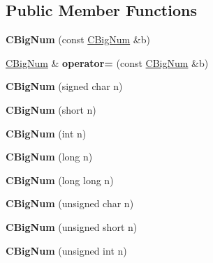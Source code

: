 \subsection*{Public Member Functions}
\begin{DoxyCompactItemize}
\item 
\mbox{\label{class_c_big_num_a50fcecb7d672c2b7d0a89e641a0682ca}} 
{\bfseries C\+Big\+Num} (const \mbox{\hyperlink{class_c_big_num}{C\+Big\+Num}} \&b)
\item 
\mbox{\label{class_c_big_num_a575e705d2120b0a43d74d798eaef48ee}} 
\mbox{\hyperlink{class_c_big_num}{C\+Big\+Num}} \& {\bfseries operator=} (const \mbox{\hyperlink{class_c_big_num}{C\+Big\+Num}} \&b)
\item 
\mbox{\label{class_c_big_num_a318644830d41471cd2bbcd702975bbb1}} 
{\bfseries C\+Big\+Num} (signed char n)
\item 
\mbox{\label{class_c_big_num_a0f4e34dcc48e9089e9f20c06418755c9}} 
{\bfseries C\+Big\+Num} (short n)
\item 
\mbox{\label{class_c_big_num_a930e53591ce24f650f7ddd1076bd4efe}} 
{\bfseries C\+Big\+Num} (int n)
\item 
\mbox{\label{class_c_big_num_a96ef554f3153f676125a49889303cf31}} 
{\bfseries C\+Big\+Num} (long n)
\item 
\mbox{\label{class_c_big_num_a221b65c70969363c1b9d940a6a2de3b5}} 
{\bfseries C\+Big\+Num} (long long n)
\item 
\mbox{\label{class_c_big_num_afe63a4eb433e69687fad44193390dc1b}} 
{\bfseries C\+Big\+Num} (unsigned char n)
\item 
\mbox{\label{class_c_big_num_a3745ad1eb1bd53c9535f8620515d3ae3}} 
{\bfseries C\+Big\+Num} (unsigned short n)
\item 
\mbox{\label{class_c_big_num_a87ff912ff941f4bc4ba10482c502757d}} 
{\bfseries C\+Big\+Num} (unsigned int n)
\item 
\mbox{\label{class_c_big_num_ab10a8c87dd0e8ca79f67df75ca7e7ecc}} 

\end{DoxyCompactItemize}
